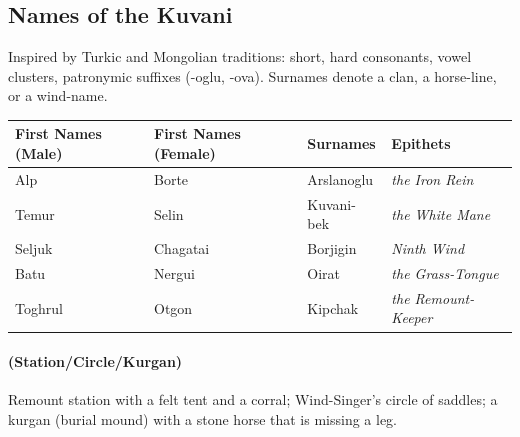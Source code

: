 \subsection*{Names of the Kuvani}
\label{sec:kuvani-names}

Inspired by Turkic and Mongolian traditions: short, hard consonants, vowel clusters, patronymic suffixes (-oglu, -ova). Surnames denote a clan, a horse-line, or a wind-name.

\begin{longtable}{|p{}|p{}|p{}|p{}|}
\hline
\textbf{First Names (Male)} & \textbf{First Names (Female)} & \textbf{Surnames} & \textbf{Epithets} \\
\hline
Alp & Borte & Arslanoglu & \textit{the Iron Rein} \\
\hline
Temur & Selin & Kuvani-bek & \textit{the White Mane} \\
\hline
Seljuk & Chagatai & Borjigin & \textit{Ninth Wind} \\
\hline
Batu & Nergui & Oirat & \textit{the Grass-Tongue} \\
\hline
Toghrul & Otgon & Kipchak & \textit{the Remount-Keeper} \\
\hline
\end{longtable}

\paragraph*{(Station/Circle/Kurgan)} Remount station with a felt tent and a corral; Wind-Singer's circle of saddles; a kurgan (burial mound) with a stone horse that is missing a leg.

